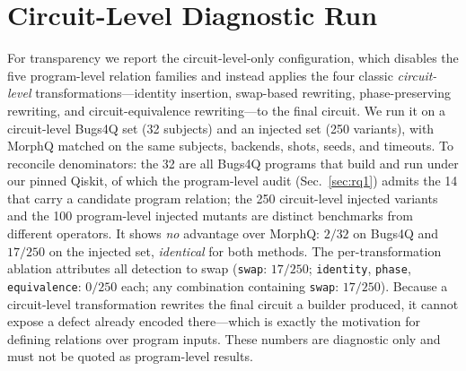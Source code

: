 \section{Circuit-Level Diagnostic Run}
\label{app:diagnostic}

For transparency we report the circuit-level-only configuration, which disables the five program-level relation families and instead applies the four classic \emph{circuit-level} transformations---identity insertion, swap-based rewriting, phase-preserving rewriting, and circuit-equivalence rewriting---to the final circuit. We run it on a circuit-level Bugs4Q set (32 subjects) and an injected set (250 variants), with MorphQ matched on the same subjects, backends, shots, seeds, and timeouts. To reconcile denominators: the 32 are all Bugs4Q programs that build and run under our pinned Qiskit, of which the program-level audit (Sec.~\ref{sec:rq1}) admits the 14 that carry a candidate program relation; the 250 circuit-level injected variants and the 100 program-level injected mutants are distinct benchmarks from different operators. It shows \emph{no} advantage over MorphQ: $2/32$ on Bugs4Q and $17/250$ on the injected set, \emph{identical} for both methods. The per-transformation ablation attributes all detection to swap (\texttt{swap}: $17/250$; \texttt{identity}, \texttt{phase}, \texttt{equivalence}: $0/250$ each; any combination containing \texttt{swap}: $17/250$). Because a circuit-level transformation rewrites the final circuit a builder produced, it cannot expose a defect already encoded there---which is exactly the motivation for defining relations over program inputs. These numbers are diagnostic only and must not be quoted as program-level results.
